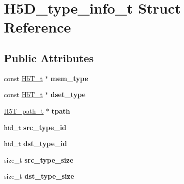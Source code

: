 \hypertarget{struct_h5_d__type__info__t}{}\section{H5\+D\+\_\+type\+\_\+info\+\_\+t Struct Reference}
\label{struct_h5_d__type__info__t}
\subsection*{Public Attributes}
\begin{DoxyCompactItemize}
\item 
\mbox{\label{struct_h5_d__type__info__t_a0f507665c69971b9a97cd85a56863202}} 
const \hyperlink{struct_h5_t__t}{H5\+T\+\_\+t} $\ast$ {\bfseries mem\+\_\+type}
\item 
\mbox{\label{struct_h5_d__type__info__t_ab275f29ea104354a6023d4f462a7cd45}} 
const \hyperlink{struct_h5_t__t}{H5\+T\+\_\+t} $\ast$ {\bfseries dset\+\_\+type}
\item 
\mbox{\label{struct_h5_d__type__info__t_a3c41393b089aba489a8e4bd7f5cce645}} 
\hyperlink{struct_h5_t__path__t}{H5\+T\+\_\+path\+\_\+t} $\ast$ {\bfseries tpath}
\item 
\mbox{\label{struct_h5_d__type__info__t_aecab5b324f079b4915da331edf8273d5}} 
hid\+\_\+t {\bfseries src\+\_\+type\+\_\+id}
\item 
\mbox{\label{struct_h5_d__type__info__t_a4af4448a7c1bed732e5329432527e4aa}} 
hid\+\_\+t {\bfseries dst\+\_\+type\+\_\+id}
\item 
\mbox{\label{struct_h5_d__type__info__t_a3362029d598a104a7df0e04ab1a90bf4}} 
size\+\_\+t {\bfseries src\+\_\+type\+\_\+size}
\item 
\mbox{\label{struct_h5_d__type__info__t_a87bdeedd2fd045783f53d3c6660ea40d}} 
size\+\_\+t {\bfseries dst\+\_\+type\+\_\+size}
\item 
\mbox{\label{struct_h5_d__type__info__t_a394e4d99372f582aba38c34783c00518}} 

\end{DoxyCompactItemize}
